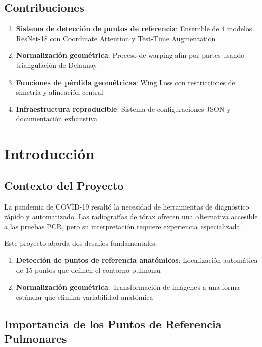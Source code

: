 \documentclass[12pt,a4paper]{article}
\begin{document}
\subsection{Contribuciones}

\begin{enumerate}
    \item \textbf{Sistema de detección de puntos de referencia}: Ensemble de 4 modelos ResNet-18 con Coordinate Attention y Test-Time Augmentation
    \item \textbf{Normalización geométrica}: Proceso de warping afín por partes usando triangulación de Delaunay
    \item \textbf{Funciones de pérdida geométricas}: Wing Loss con restricciones de simetría y alineación central
    \item \textbf{Infraestructura reproducible}: Sistema de configuraciones JSON y documentación exhaustiva
\end{enumerate}

\section{Introducción}

\subsection{Contexto del Proyecto}

La pandemia de COVID-19 resaltó la necesidad de herramientas de diagnóstico rápido y automatizado. Las radiografías de tórax ofrecen una alternativa accesible a las pruebas PCR, pero su interpretación requiere experiencia especializada.

Este proyecto aborda dos desafíos fundamentales:

\begin{enumerate}
    \item \textbf{Detección de puntos de referencia anatómicos}: Localización automática de 15 puntos que definen el contorno pulmonar
    \item \textbf{Normalización geométrica}: Transformación de imágenes a una forma estándar que elimina variabilidad anatómica
\end{enumerate}

\subsection{Importancia de los Puntos de Referencia Pulmonares}
\end{document}

